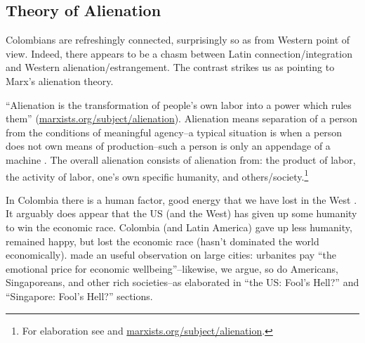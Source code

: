 \documentclass[10pt, letterpaper]{article}
\begin{document}
\begin{spacing}{2}
\subsection{%
  Theory of Alienation}

Colombians are refreshingly connected, surprisingly so as from Western
point of view. Indeed, there appears to be a chasm between Latin connection/integration and
Western alienation/estrangement. The contrast strikes us as pointing to Marx's
alienation theory.      

``Alienation is the transformation of people's own labor into a power which
rules them'' (\url{marxists.org/subject/alienation}). 
 Alienation means separation of a person from the conditions of
 meaningful agency--a typical situation is when a person does not own means of
 production--such a person is only an appendage of a machine \citep{horowitzMISC10}. %
 The overall %
 alienation consists of alienation from: the product of labor,
the activity of labor, one's own specific humanity, and others/society.\footnote{For elaboration see \citet{horowitzMISC10} and
 \url{marxists.org/subject/alienation}. %
} 


In Colombia there is a human factor, good energy that we have lost in the West %
 \citep{freud30}.
 It arguably does appear that the US (and the West) has given up some humanity to win the
 economic race. Colombia (and Latin America) gave up less humanity, remained 
 happy, but lost the economic race (hasn't dominated the world economically).
\citet[][p.233]{fischer73} made an useful observation on large cities: urbanites pay
``the emotional price for economic wellbeing''--likewise, we argue, so do
Americans, Singaporeans, and other rich societies--as elaborated in ``the US:
Fool's Hell?'' and ``Singapore:
Fool's Hell?''  sections.
 

\end{spacing}
\end{document}
